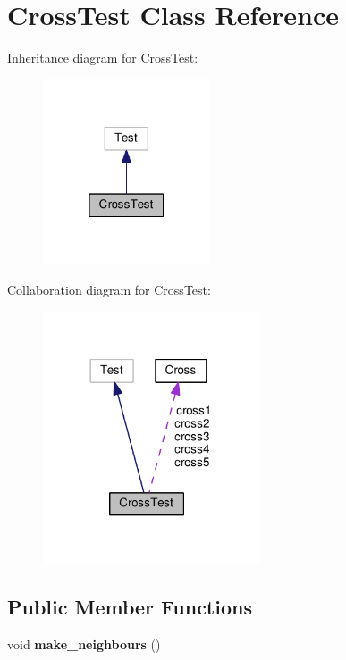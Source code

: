 \hypertarget{classCrossTest}{\section{Cross\-Test Class Reference}
\label{classCrossTest}
}


Inheritance diagram for Cross\-Test\-:
\nopagebreak
\begin{figure}[H]
\begin{center}
\leavevmode
\includegraphics[width=140pt]{classCrossTest__inherit__graph}
\end{center}
\end{figure}


Collaboration diagram for Cross\-Test\-:
\nopagebreak
\begin{figure}[H]
\begin{center}
\leavevmode
\includegraphics[width=182pt]{classCrossTest__coll__graph}
\end{center}
\end{figure}
\subsection*{Public Member Functions}
\begin{DoxyCompactItemize}
\item 
\hypertarget{classCrossTest_a36c8b9516a0ecde4b7caad5524c60c2d}{void {\bfseries make\-\_\-neighbours} ()}\label{classCrossTest_a36c8b9516a0ecde4b7caad5524c60c2d}

\end{DoxyCompactItemize}
